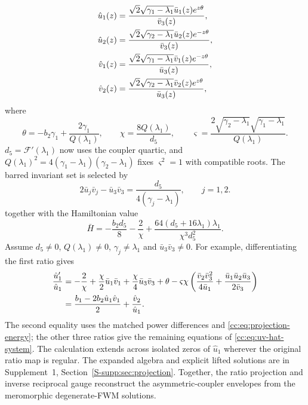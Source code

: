 \documentclass{optica-article}
\numberwithin{equation}{section}
\begin{document}
\begin{align}
  \hat{u}_1{\left(z\right)} &= \frac{\sqrt{2} \sqrt{{\gamma}_{1} - {\lambda}_{1}} \bar{u}_1{\left(z\right)} e^{z \theta}}{\bar{v}_3{\left(z\right)}}, \notag \\
  \hat{u}_2{\left(z\right)} &= \frac{\sqrt{2} \sqrt{{\gamma}_{2} - {\lambda}_{1}} \bar{u}_2{\left(z\right)} e^{-z \theta}}{\bar{v}_3{\left(z\right)}}, \notag \\
  \hat{v}_1{\left(z\right)} &= \frac{\sqrt{2} \sqrt{{\gamma}_{1} - {\lambda}_{1}} \bar{v}_1{\left(z\right)} e^{-z \theta}}{\bar{u}_3{\left(z\right)}}, \notag \\
  \hat{v}_2{\left(z\right)} &= \frac{\sqrt{2} \sqrt{{\gamma}_{2} - {\lambda}_{1}} \bar{v}_2{\left(z\right)} e^{z \theta}}{\bar{u}_3{\left(z\right)}}, \label{cc:eq:projection-hat-as-bars}
\end{align}
where
\begin{equation}
\theta=-b_2\gamma_1+\frac{2\gamma_1}{Q(\lambda_1)},\qquad
\chi=\frac{8Q(\lambda_1)}{d_5},\qquad
\varsigma=\frac{2\sqrt{\gamma_2-\lambda_1}\sqrt{\gamma_1-\lambda_1}}{Q(\lambda_1)}.
\label{cc:eq:projection-constants}
\end{equation}
$d_5=\mathcal F'(\lambda_1)$ now uses the coupler quartic, and $Q(\lambda_1)^2=4(\gamma_1-\lambda_1)(\gamma_2-\lambda_1)$ fixes $\varsigma^2=1$ with compatible roots.
The barred invariant set is selected by
\begin{equation}
2\bar u_j\bar v_j-\bar u_3\bar v_3
=\frac{d_5}{4(\gamma_j-\lambda_1)},\qquad j=1,2.
\label{cc:eq:projection-powers}
\end{equation}
together with the Hamiltonian value
\begin{equation}
\bar H=-\frac{b_2d_5}{8}-\frac2\chi
+\frac{64(d_5+16\lambda_1)\lambda_1}{\chi^3d_5^2}.
\label{cc:eq:projection-energy}
\end{equation}
Assume $d_5\ne0$, $Q(\lambda_1)\ne0$, $\gamma_j\ne\lambda_1$ and $\bar u_3\bar v_3\ne0$.
For example, differentiating the first ratio gives
\begin{align}
\frac{\hat u_1'}{\hat u_1}
&=-\frac2\chi+\frac\chi2\bar u_1\bar v_1+\frac\chi4\bar u_3\bar v_3+\theta
-\varsigma\chi\left(\frac{\bar v_2\bar v_3^2}{4\bar u_1}
+\frac{\bar u_1\bar u_2\bar u_3}{2\bar v_3}\right)\notag\\
&=\frac{b_1-2b_2\hat u_1\hat v_1}{2}+\frac{\hat v_2}{\hat u_1}.
\label{cc:eq:projection-key-identity}
\end{align}
The second equality uses the matched power differences and \eqref{cc:eq:projection-energy}; the other three ratios give the remaining equations of \eqref{cc:eq:uv-hat-system}.
The calculation extends across isolated zeros of $\hat u_1$ wherever the original ratio map is regular.
The expanded algebra and explicit lifted solutions are in Supplement~1, Section~\ref*{S-supp:sec:projection}.
Together, the ratio projection and inverse reciprocal gauge reconstruct the asymmetric-coupler envelopes from the meromorphic degenerate-FWM solutions.
\end{document}
